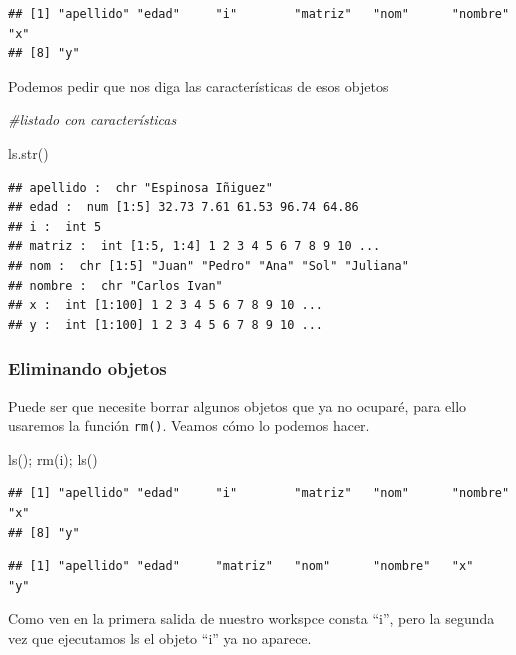 \documentclass[
]{article}
\newenvironment{Shaded}{\begin{snugshade}}{\end{snugshade}}
\newcommand{\CommentTok}[1]{\textcolor[rgb]{0.56,0.35,0.01}{\textit{#1}}}
\newcommand{\FunctionTok}[1]{\textcolor[rgb]{0.00,0.00,0.00}{#1}}
\newcommand{\NormalTok}[1]{#1}
\begin{document}
\begin{verbatim}
## [1] "apellido" "edad"     "i"        "matriz"   "nom"      "nombre"   "x"       
## [8] "y"
\end{verbatim}

Podemos pedir que nos diga las características de esos objetos

\begin{Shaded}
\begin{Highlighting}[]
\CommentTok{\#listado con características}

\FunctionTok{ls.str}\NormalTok{()}
\end{Highlighting}
\end{Shaded}

\begin{verbatim}
## apellido :  chr "Espinosa Iñiguez"
## edad :  num [1:5] 32.73 7.61 61.53 96.74 64.86
## i :  int 5
## matriz :  int [1:5, 1:4] 1 2 3 4 5 6 7 8 9 10 ...
## nom :  chr [1:5] "Juan" "Pedro" "Ana" "Sol" "Juliana"
## nombre :  chr "Carlos Ivan"
## x :  int [1:100] 1 2 3 4 5 6 7 8 9 10 ...
## y :  int [1:100] 1 2 3 4 5 6 7 8 9 10 ...
\end{verbatim}

\hypertarget{eliminando-objetos}{%
\subsubsection{Eliminando objetos}\label{eliminando-objetos}}

Puede ser que necesite borrar algunos objetos que ya no ocuparé, para
ello usaremos la función \texttt{rm()}. Veamos cómo lo podemos hacer.

\begin{Shaded}
\begin{Highlighting}[]
\FunctionTok{ls}\NormalTok{(); }\FunctionTok{rm}\NormalTok{(i); }\FunctionTok{ls}\NormalTok{()}
\end{Highlighting}
\end{Shaded}

\begin{verbatim}
## [1] "apellido" "edad"     "i"        "matriz"   "nom"      "nombre"   "x"       
## [8] "y"
\end{verbatim}

\begin{verbatim}
## [1] "apellido" "edad"     "matriz"   "nom"      "nombre"   "x"        "y"
\end{verbatim}

Como ven en la primera salida de nuestro workspce consta ``i'', pero la
segunda vez que ejecutamos ls el objeto ``i'' ya no aparece.
\end{document}
